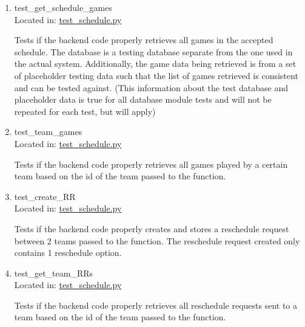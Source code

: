 \documentclass[12pt, titlepage]{article}
\begin{document}

\begin{enumerate}

\item{test\_get\_schedule\_games\\}
  Located in: \href{https://github.com/Nicholas-Fabugais-Inaba/Sandlot/blob/pytest-workflow/test/test\_schedule.py}{test\_schedule.py}
  
  Tests if the backend code properly retrieves all games in the accepted schedule. The 
  database is a testing database separate from the one used in the actual system. 
  Additionally, the game data being retrieved is from a set of placeholder testing data
  such that the list of games retrieved is consistent and can be tested against. (This 
  information about the test database and placeholder data is true for all database module
  tests and will not be repeated for each test, but will apply)

  \item{test\_team\_games\\}
  Located in: \href{https://github.com/Nicholas-Fabugais-Inaba/Sandlot/blob/pytest-workflow/test/test\_schedule.py}{test\_schedule.py}
  
  Tests if the backend code properly retrieves all games played by a certain team based on 
  the id of the team passed to the function.

  \item{test\_create\_RR\\}
  Located in: \href{https://github.com/Nicholas-Fabugais-Inaba/Sandlot/blob/pytest-workflow/test/test\_schedule.py}{test\_schedule.py}
  
  Tests if the backend code properly creates and stores a reschedule request between 2 teams
  passed to the function. The reschedule request created only contains 1 reschedule option.

  \item{test\_get\_team\_RRs\\}
  Located in: \href{https://github.com/Nicholas-Fabugais-Inaba/Sandlot/blob/pytest-workflow/test/test\_schedule.py}{test\_schedule.py}
  
  Tests if the backend code properly retrieves all reschedule requests sent to a team 
  based on the id of the team passed to the function.


\end{enumerate}
\end{document}
